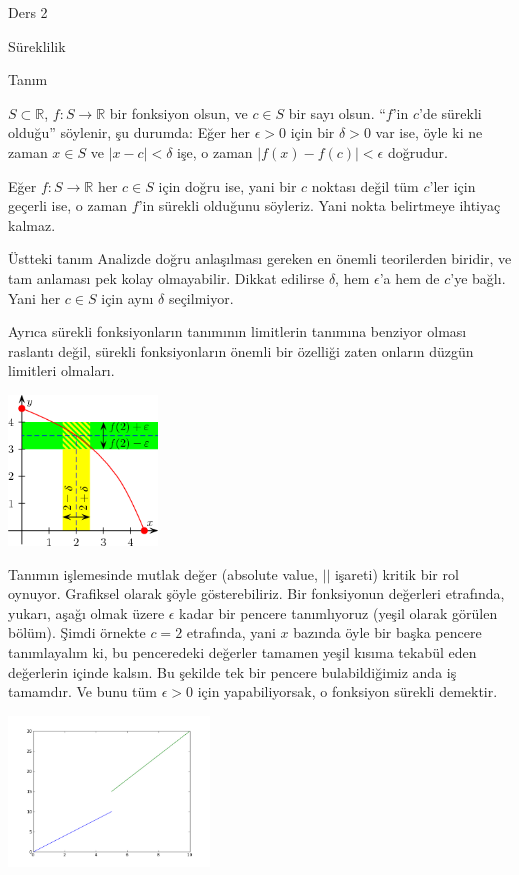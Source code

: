 \documentclass[12pt,fleqn]{article}\usepackage{../../common}
\begin{document}
Ders 2

Süreklilik

Tanım

$S \subset \mathbb{R}$, $f: S \to \mathbb{R}$ bir fonksiyon olsun, ve $c \in S$
bir sayı olsun. ``$f$'in $c$'de sürekli olduğu'' söylenir, şu durumda: Eğer her
$\epsilon>0$ için bir $\delta > 0$ var ise, öyle ki ne zaman $x \in S$ ve $|x-c|
< \delta$ işe, o zaman $|f(x) - f(c)| < \epsilon$ doğrudur.

Eğer $f: S \to \mathbb{R}$ her $c \in S$ için doğru ise, yani bir $c$ noktası
değil tüm $c$'ler için geçerli ise, o zaman $f$'in sürekli olduğunu
söyleriz. Yani nokta belirtmeye ihtiyaç kalmaz.

Üstteki tanım Analizde doğru anlaşılması gereken en önemli teorilerden biridir,
ve tam anlaması pek kolay olmayabilir. Dikkat edilirse $\delta$, hem
$\epsilon$'a hem de $c$'ye bağlı. Yani her $c \in S$ için aynı $\delta$
seçilmiyor.

Ayrıca sürekli fonksiyonların tanımının limitlerin tanımına benziyor olması
raslantı değil, sürekli fonksiyonların önemli bir özelliği zaten onların düzgün
limitleri olmaları.

\includegraphics[height=4cm]{2_5.png}

Tanımın işlemesinde mutlak değer (absolute value, $||$ işareti) kritik bir rol
oynuyor. Grafiksel olarak şöyle gösterebiliriz. Bir fonksiyonun değerleri
etrafında, yukarı, aşağı olmak üzere $\epsilon$ kadar bir pencere tanımlıyoruz
(yeşil olarak görülen bölüm). Şimdi örnekte $c=2$ etrafında, yani $x$ bazında
öyle bir başka pencere tanımlayalım ki, bu penceredeki değerler tamamen yeşil
kısıma tekabül eden değerlerin içinde kalsın. Bu şekilde tek bir pencere
bulabildiğimiz anda iş tamamdır. Ve bunu tüm $\epsilon > 0$ için yapabiliyorsak,
o fonksiyon sürekli demektir.

\includegraphics[height=4cm]{2_4.png}
\end{document}
